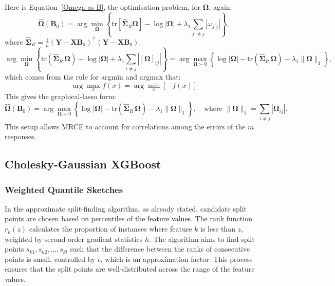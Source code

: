 \documentclass[11pt]{report} %
\begin{document}
Here is Equation~\ref{Omega as B}, the optimisation problem, for $\mathbf{\Omega}$, again:
\begin{equation*}
    \hat{\boldsymbol{\Omega}}(\mathbf{B}_0) = \arg \min_{\boldsymbol{\Omega}} \left\{ \text{tr} \left[ \hat{\mathbf{\Sigma}}_R \boldsymbol{\Omega} \right] - \log |\boldsymbol{\Omega}| + \lambda_1 \sum_{j' \neq j} |\omega_{j'j}| \right\},
\end{equation*}
\noindent where $\hat{\mathbf{\Sigma}}_R=\frac{1}{n} (\mathbf{Y} - \mathbf{X} \mathbf{B}_0)^\top (\mathbf{Y} - \mathbf{X} \mathbf{B}_0)$.
\[
\arg\min_{\mathbf{\Omega}} \left\{ \mathrm{tr}( \hat{\mathbf{\Sigma}}_R\, \mathbf{\Omega} ) - \log|\mathbf{\Omega}| + \lambda_1 \sum_{i \ne j} | [\mathbf{\Omega}]_{ij} | \right\}
=
\arg\max_{\mathbf{\Omega} \succ 0} \left\{ \log|\mathbf{\Omega}| - \mathrm{tr}( \hat{\mathbf{\Sigma}}_R\, \mathbf{\Omega} ) - \lambda_1 \| \mathbf{\Omega} \|_1 \right\},
\]
which comes from the rule for argmin and argmax that:
\[
\arg\max_x f(x) = \arg\min_x \left[ -f(x) \right]
\]
This gives the graphical-lasso form:
\[
\hat{\mathbf{\Omega}}( \mathbf{B}_0 )
= \arg\max_{\mathbf{\Omega} \succ 0}
\left\{
\log|\mathbf{\Omega}| - \mathrm{tr}( \hat{\mathbf{\Sigma}}_R\, \mathbf{\Omega} ) - \lambda_1 \| \mathbf{\Omega} \|_1
\right\},
\quad \text{where } \| \mathbf{\Omega} \|_1 = \sum_{i \ne j} \left| \mathbf{\Omega}_{ij} \right|.
\]
This setup allows MRCE to account for correlations among the errors of the \(m\) responses.
\subsection{Cholesky-Gaussian XGBoost}
\subsubsection{Weighted Quantile Sketches}
\label{WQS}
In the approximate split-finding algorithm, as already stated, candidate split points are chosen based on percentiles of the feature values. The rank function \( r_k(z) \) calculates the proportion of instances where feature \( k \) is less than \( z \), weighted by second-order gradient statistics \( h \).\cite{chen2016xgboost} The algorithm aims to find split points \( s_{k1}, s_{k2}, \dots, s_{kl} \) such that the difference between the ranks of consecutive points is small, controlled by \( \epsilon \), which is an approximation factor.\cite{chen2016xgboost} This process ensures that the split points are well-distributed across the range of the feature values.
\end{document}
